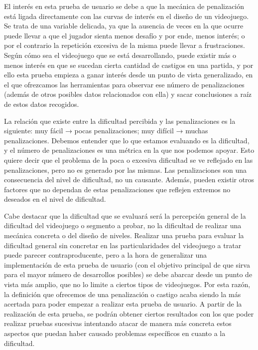 El interés en esta prueba de usuario se debe a que la mecánica de penalización está ligada directamente con las curvas de interés en el diseño de un videojuego. Se trata de una variable delicada, ya que la ausencia de veces en la que ocurre puede llevar a que el jugador sienta menos desafío y por ende, menos interés; o por el contrario la repetición excesiva de la misma puede llevar a frustraciones. Según cómo sea el videojuego que se está desarrollando, puede existir más o menos interés en que se sucedan cierta cantidad de castigos en una partida, y por ello esta prueba empieza a ganar interés desde un punto de vista generalizado, en el que ofrezcamos las herramientas para observar ese número de penalizaciones (además de otros posibles datos relacionados con ella) y sacar conclusiones a raíz de estos datos recogidos. 


La relación que existe entre la dificultad percibida y las penalizaciones es la siguiente: muy fácil → pocas penalizaciones; muy difícil → muchas penalizaciones. Debemos entender que lo que estamos evaluando es la dificultad, y el número de penalizaciones es una métrica en la que nos podemos apoyar. Esto quiere decir que el problema de la poca o excesiva dificultad se ve reflejado en las penalizaciones, pero no es generado por las mismas. Las penalizaciones son una consecuencia del nivel de dificultad, no un causante. Además, pueden existir otros factores que no dependan de estas penalizaciones que reflejen extremos no deseados en el nivel de dificultad.


Cabe destacar que la dificultad que se evaluará será la percepción general de la dificultad del videojuego o segmento a probar, no la dificultad de realizar una mecánica concreta o del diseño de niveles. Realizar una prueba para evaluar la dificultad general sin concretar en las particularidades del videojuego a tratar puede parecer contraproducente, pero a la hora de generalizar una implementación de esta prueba de usuario (con el objetivo principal de que sirva para el mayor número de desarrollos posibles) se debe abarcar desde un punto de vista más amplio, que no lo limite a ciertos tipos de videojuegos. Por esta razón, la definición que ofrecemos de una penalización o castigo acaba siendo la más acertada para poder empezar a realizar esta prueba de usuario. A partir de la realización de esta prueba, se podrán obtener ciertos resultados con los que poder realizar pruebas sucesivas intentando atacar de manera más concreta estos aspectos que puedan haber causado problemas específicos en cuanto a la dificultad.


